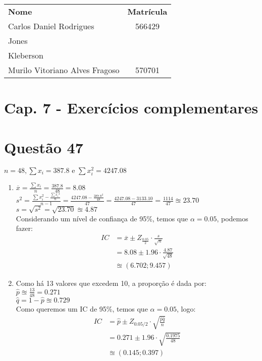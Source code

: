 \documentclass[12pt]{article}
\newcommand{\quest}[1]{\section*{Questão #1}} %
\begin{document}
\begin{table}[]
\centering
\begin{tabular}{lc}
\hline
\textbf{Nome}                  & \textbf{Matrícula}\\
Carlos Daniel Rodrigues        &  566429           \\
Jones                          &                   \\
Kleberson                      &                   \\
Murilo Vitoriano Alves Fragoso & 570701            \\ \hline
\end{tabular}
\end{table}

\section{Cap. 7 - Exercícios complementares}
\quest{47}
$n = 48, \sum{x_i}= 387.8 \text{ e } \sum{x_i^2=4247.08}$ 
\begin{enumerate}
    \item $\overline{x} = \frac{\sum{x_i}}{n} = \frac{387.8}{48} = 8.08$\\
          $s^2 = \frac{\sum{x_i^2} - \frac{\sum{x_i}^2}{n}}{n-1} = \frac{4247.08 - \frac{387.8^2}{48}}{47} = \frac{4247.08-3133.10}{47} = \frac{1114}{47} \approxeq 23.70$\\
          $s = \sqrt{s^2} = \sqrt{23.70} \approxeq 4.87$\\
          Considerando um nível de confiança de 95\%, temos que $\alpha = 0.05$, podemos fazer:
          \begin{align*}
              IC &= \overline{x} \pm Z_{\frac{0.05}{2}} \cdot \frac{s}{\sqrt{n}}\\
                 &= 8.08 \pm 1.96 \cdot \frac{4.87}{\sqrt{48}}\\
                 &\approxeq \left (6.702; 9.457 \right)
          \end{align*}
    \item Como há 13 valores que excedem 10, a proporção é dada por:\\
    $\hat{p} \approxeq \frac{13}{48} = 0.271$\\
    $\hat{q} = 1 - \hat{p} \approxeq 0.729$\\
    Como queremos um IC de 95\%, temos que $\alpha = 0.05$, logo:
    \begin{align*}
        IC &= \hat{p} \pm Z_{0.05/2} \cdot \sqrt{\frac{\hat{p}\hat{q}}{n}}\\
            &= 0.271 \pm 1.96 \cdot \sqrt{\frac{0.1975}{48}}\\
            &\approxeq (0.145;0.397)
    \end{align*}
\end{enumerate}
\end{document}
